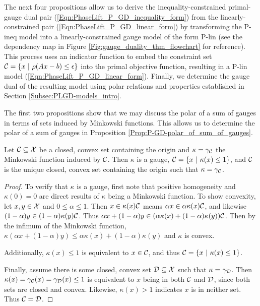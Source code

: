 The next four propositions allow us to derive the inequality-constrained primal-gauge dual pair (\ref{Eqn:PhaseLift_P_GD_inequality_form}) from the linearly-constrained pair (\ref{Eqn:PhaseLift_P_GD_linear_form}) by transforming the P-ineq model into a linearly-constrained gauge model of the form P-lin (see the dependency map in Figure \ref{Fig:gauge_duality_thm_flowchart} for reference).   
This process uses an indicator function to embed the constraint set ${\mathcal C} = \{ x \ | \ \rho(Ax-b) \leq \epsilon\}$ into the primal objective function, resulting in a P-lin model (\ref{Eqn:PhaseLift_P_GD_linear_form}).  Finally, we determine the gauge dual of the resulting model using polar relations and properties established in Section \ref{Subsec:PLGD-models_intro}.


The first two propositions show that we may discuss the polar of a sum of gauges in terms of sets induced by Minkowski functions.  This allows us to determine the polar of a sum of gauges in Proposition \ref{Prop:P-GD-polar_of_sum_of_gauges}.

\begin{prop} 			\label{Prop:P-GD-Minkowski_set_unique}
Let ${\mathcal C} \subseteq {\mathcal X}$ be a closed, convex set containing the origin and $\kappa = \gamma_{\mathcal C}$ the Minkowski function induced by ${\mathcal C}$.  Then $\kappa$ is a gauge, ${\mathcal C} = \{ x \ | \ \kappa(x) \leq 1 \}$, and ${\mathcal C}$ is the unique closed, convex set containing the origin such that $\kappa = \gamma_{\mathcal C}$.
\end{prop}
\begin{proof}
To verify that $\kappa$ is a gauge, first note that positive homogeneity and $\kappa(0) = 0$ are direct results of $\kappa$ being a Minkowski function.  To show convexity, let $x, y \in {\mathcal X}$ and $0 \leq \alpha \leq 1$.  Then $x \in \kappa(x) {\mathcal C}$ means $\alpha x \in \alpha \kappa(x) {\mathcal C}$, and likewise $(1-\alpha) y \in (1-\alpha) \kappa(y) {\mathcal C}$.  Thus $\alpha x + (1-\alpha)y \in (\alpha \kappa(x) + (1-\alpha) \kappa(y)) {\mathcal C}$.  Then by the infimum of the Minkowski function, $\kappa(\alpha x + (1-\alpha) y) \leq \alpha \kappa(x) + (1-\alpha) \kappa(y)$ and $\kappa$ is convex.

Additionally, $\kappa(x) \leq 1$ is equivalent to $x \in {\mathcal C}$, and thus ${\mathcal C} =  \{ x \ | \ \kappa(x) \leq 1 \}$.

Finally, assume there is some closed, convex set ${\mathcal D} \subseteq {\mathcal X}$ such that $\kappa = \gamma_{\mathcal D}$.  Then $\kappa(x) = \gamma_{\mathcal C}(x) = \gamma_{\mathcal D}(x) \leq 1$ is equivalent to $x$ being in both ${\mathcal C}$ and ${\mathcal D}$, since both sets are closed and convex. Likewise, $\kappa(x) > 1$ indicates $x$ is in neither set.  Thus ${\mathcal C} = {\mathcal D}$.

\end{proof}

